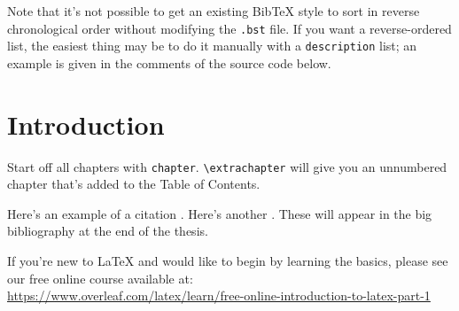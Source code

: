 \documentclass[12pt]{caltech_thesis}
\begin{document}
\begin{publishedcontent}%
\nocite{Cahn:etal:2015,Cahn:etal:2016}
\end{publishedcontent}

Note that it's not possible to get an existing BibTeX style to sort in reverse chronological order without modifying the \texttt{.bst} file. If you want a reverse-ordered list, the easiest thing may be to do it manually with a \texttt{description} list; an example is given in the comments of the source code below.




\tableofcontents
\listoffigures
\listoftables
\printnomenclature

\mainmatter

\chapter{Introduction}
Start off all chapters with \verb|chapter|.  \verb|\extrachapter| will give you an unnumbered chapter that's added to the Table of Contents. 

Here's an example of a citation \citep{GMP81}. Here's another \citep{PP98}. These will appear in the big bibliography at the end of the thesis.

If you're new to \LaTeX{} and would like to begin by learning the basics, please see our free online course available at:\\ \url{https://www.overleaf.com/latex/learn/free-online-introduction-to-latex-part-1} 
\end{document}
